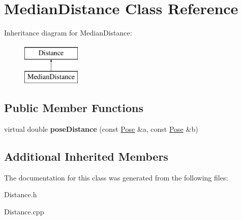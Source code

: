 \hypertarget{classMedianDistance}{}\section{Median\+Distance Class Reference}
\label{classMedianDistance}
Inheritance diagram for Median\+Distance\+:\begin{figure}[H]
\begin{center}
\leavevmode
\includegraphics[height=2.000000cm]{classMedianDistance}
\end{center}
\end{figure}
\subsection*{Public Member Functions}
\begin{DoxyCompactItemize}
\item 
\hypertarget{classMedianDistance_a0b249958c04e6b9a35ffc31293fffb62}{}virtual double {\bfseries pose\+Distance} (const \hyperlink{classPose}{Pose} \&a, const \hyperlink{classPose}{Pose} \&b)\label{classMedianDistance_a0b249958c04e6b9a35ffc31293fffb62}

\end{DoxyCompactItemize}
\subsection*{Additional Inherited Members}


The documentation for this class was generated from the following files\+:\begin{DoxyCompactItemize}
\item 
Distance.\+h\item 
Distance.\+cpp\end{DoxyCompactItemize}
